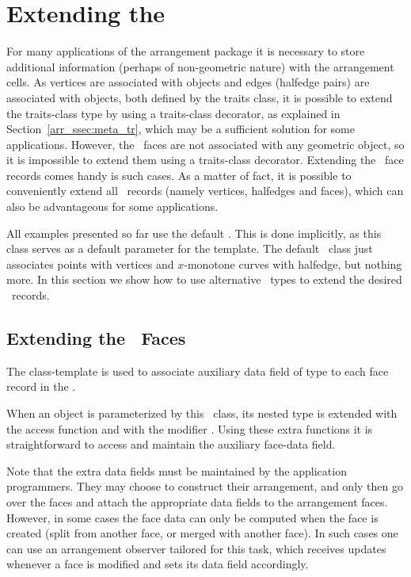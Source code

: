 \section{Extending the \dcel}
\label{arr_sec:ex_dcel}
%
For many applications of the arrangement package it is necessary to
store additional information (perhaps of non-geometric nature) with
the arrangement cells. As vertices are associated with 
objects and edges (halfedge pairs) are associated with
 objects, both defined by the traits class,
it is possible to extend the traits-class type by using a traits-class
decorator, as explained in Section~\ref{arr_ssec:meta_tr}, which may
be a sufficient solution for some applications.
However, the \dcel\ faces are not associated with any geometric object, 
so it is impossible to extend them using a traits-class decorator. 
Extending the \dcel\ face records comes handy is such cases. As a matter
of fact, it is possible to conveniently extend all \dcel\ records
(namely vertices, halfedges and faces), which can also be advantageous
for some applications.

All examples presented so far use the default . 
This is done implicitly, as this class serves as a default parameter for 
the  template. The default \dcel\ class just associates 
points with vertices and $x$-monotone curves with halfedge, but nothing more. 
In this section we show how to use alternative \dcel\ types to extend the 
desired \dcel\ records.

\subsection{Extending the \dcel\ Faces}
\label{arr_ssec:ex_dcel_face}
%
The  class-template
is used to associate auxiliary data field of type  to
each face record in the \dcel.

When an  object is parameterized by this 
\dcel\ class, its nested  type is extended with the access function
 and with the modifier . Using these extra
functions it is straightforward to access and maintain the auxiliary
face-data field.

Note that the extra data fields must be maintained by the application
programmers. They may choose to construct their arrangement, and
only then go over the faces and attach the appropriate data fields to
the arrangement faces. However, in some cases the face data can only
be computed when the face is created (split from another face, or merged
with another face). In such cases one can use an arrangement observer
tailored for this task, which receives updates whenever a face is
modified and sets its data field accordingly.


